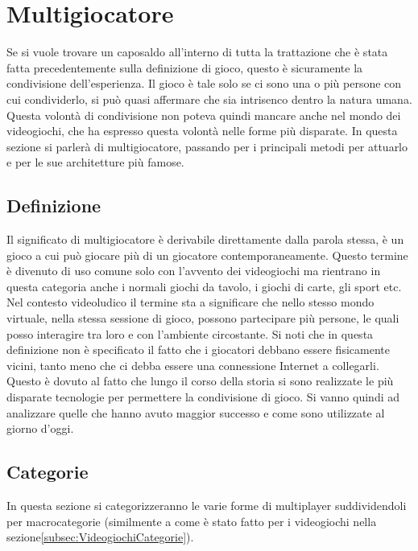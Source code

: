 \section{Multigiocatore}\label{sec:Multigiocatore}
    Se si vuole trovare un caposaldo all'interno di tutta la trattazione che è stata fatta precedentemente sulla definizione di gioco, questo è sicuramente la condivisione dell'esperienza. 
    Il gioco è tale solo se ci sono una o più persone con cui condividerlo, si può quasi affermare che sia intrisenco dentro la natura umana. Questa volontà di condivisione 
    non poteva quindi mancare anche nel mondo dei videogiochi, che ha espresso questa volontà nelle forme più disparate. In questa sezione si parlerà di multigiocatore, passando per 
    i principali metodi per attuarlo e per le sue architetture più famose.
    \subsection{Definizione}\label{subsec:MultiDef}
        Il significato di multigiocatore è derivabile direttamente dalla parola stessa, è un gioco a cui può giocare più di un giocatore contemporaneamente. Questo termine è divenuto 
        di uso comune solo con l'avvento dei videogiochi ma rientrano in questa categoria anche i normali giochi da tavolo, i giochi di carte, gli sport etc.\\
        Nel contesto videoludico il termine sta a significare che nello stesso mondo virtuale, nella stessa sessione di gioco, possono partecipare più persone, le quali posso interagire
        tra loro e con l'ambiente circostante. Si noti che in questa definizione non è specificato il fatto che i giocatori debbano essere fisicamente vicini, tanto meno che ci 
        debba essere una connessione Internet a collegarli. Questo è dovuto al fatto che lungo il corso della storia si sono realizzate le più disparate tecnologie per permettere la
        condivisione di gioco. Si vanno quindi ad analizzare quelle che hanno avuto maggior successo e come sono utilizzate al giorno d'oggi.

    \subsection{Categorie}\label{subsec:MultiCategorie}
        In questa sezione si categorizzeranno le varie forme di multiplayer suddividendoli per macrocategorie (similmente a come è stato fatto per i videogiochi nella sezione\ref{subsec:VideogiochiCategorie}).

